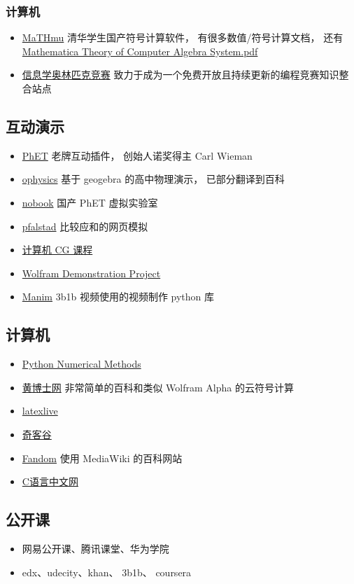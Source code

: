 \subsubsection{计算机}
\begin{itemize}
\item \href{http://mathmu.github.io/MTCAS/RecentChanges.html}{MaTHmu} 清华学生国产符号计算软件， 有很多数值/符号计算文档， 还有 \href{https://github.com/maTHmU/MTCAS}{Mathematica Theory of Computer Algebra System.pdf}
\item \href{https://oi-wiki.org/}{信息学奥林匹克竞赛} 致力于成为一个免费开放且持续更新的编程竞赛知识整合站点
\end{itemize}

\subsection{互动演示}
\begin{itemize}
\item \href{https://phet.colorado.edu/}{PhET} 老牌互动插件， 创始人诺奖得主 Carl Wieman
\item \href{https://ophysics.com/}{ophysics} 基于 geogebra 的高中物理演示， 已部分翻译到百科
\item \href{https://www.nobook.com/}{nobook} 国产 PhET 虚拟实验室
\item \href{https://www.falstad.com/}{pfalstad} 比较应和的网页模拟
\item \href{http://www.cs.cornell.edu/courses/cs5643/2010sp/}{计算机 CG 课程}
\item \href{https://demonstrations.wolfram.com/topics.php?PhysicalSciences#5}{Wolfram Demonstration Project}
\item \href{https://github.com/3b1b/manim}{Manim} 3b1b 视频使用的视频制作 python 库
\end{itemize}

\subsection{计算机}
\begin{itemize}
\item \href{https://pythonnumericalmethods.berkeley.edu/notebooks/Index.html}{Python Numerical Methods}
\item \href{http://www.drhuang.com/}{黄博士网} 非常简单的百科和类似 Wolfram Alpha 的云符号计算
\item \href{https://www.latexlive.com/}{latexlive}
\item \href{https://www.qikegu.com/}{奇客谷}
\item \href{https://harrypotter.fandom.com/zh/wiki/Special:用户贡献/Laoxie.H}{Fandom} 使用 MediaWiki 的百科网站
\item \href{http://c.biancheng.net/}{C语言中文网}
\end{itemize}

\subsection{公开课}
\begin{itemize}
\item 网易公开课、腾讯课堂、华为学院
\item edx、udecity、khan、 3b1b、 coursera
\end{itemize}
